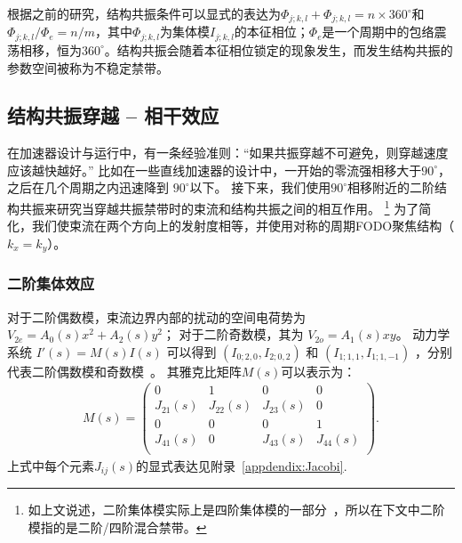 根据之前的研究\cite{11,12}，结构共振条件可以显式的表达为$\Phi_{j;k,l}+\Phi_{j;k,l}=n\times 360^{\circ}$和$\Phi_{j;k,l}/\Phi_{e}=n/m$，其中$\Phi_{j;k,l}$为集体模$I_{j;k,l}$的本征相位；$\Phi_{e}$是一个周期中的包络震荡相移，恒为$360^{\circ}$。结构共振会随着本征相位锁定的现象发生，而发生结构共振的参数空间被称为不稳定禁带。

\subsection{结构共振穿越 -- 相干效应}
\label{section:Crossing_Coherent}
在加速器设计与运行中，有一条经验准则：“如果共振穿越不可避免，则穿越速度应该越快越好。”
比如在一些直线加速器的设计中，一开始的零流强相移大于$90^{\circ}$，之后在几个周期之内迅速降到 $90^{\circ}$以下。
接下来，我们使用$90^{\circ}$相移附近的二阶结构共振来研究当穿越共振禁带时的束流和结构共振之间的相互作用。
\footnote{如上文说述，二阶集体模实际上是四阶集体模的一部分~\cite{12}，所以在下文中二阶模指的是二阶/四阶混合禁带。}
为了简化，我们使束流在两个方向上的发射度相等，并使用对称的周期FODO聚焦结构（$k_x=k_y$）。

\subsubsection{二阶集体效应}
对于二阶偶数模，束流边界内部的扰动的空间电荷势为  $V_{2e} = A_0(s)x^2 + A_2(s)y^2$；
对于二阶奇数模，其为 $V_{2o}=A_1(s)xy$。
动力学系统 $I'(s)=M(s)I(s)$ 可以得到 $(I_{0;2,0}, I_{2;0,2})$ 和  $(I_{1;1,1}, I_{1;1,-1})$ ，分别代表二阶偶数模和奇数模~\cite{11, 12, 18}。
其雅克比矩阵$M(s)$可以表示为：
\begin{eqnarray}\label{eq2.5}
M(s)=
\left(
  \begin{array}{cccc}
    0         & 1         & 0         & 0         \\
    J_{21}(s) & J_{22}(s) & J_{23}(s) & 0         \\
    0         & 0         & 0         & 1         \\
    J_{41}(s) & 0         & J_{43}(s) & J_{44}(s) \\
  \end{array}
\right).
\end{eqnarray}
上式中每个元素$J_{ij}(s)$的显式表达见附录~\ref{appdendix:Jacobi}.

